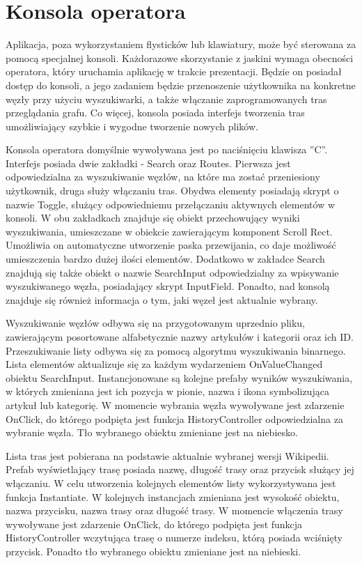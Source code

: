 \section{Konsola operatora}
Aplikacja, poza wykorzystaniem flysticków lub klawiatury, może być sterowana za pomocą specjalnej konsoli. Każdorazowe skorzystanie z jaskini wymaga obecności operatora, który uruchamia aplikację w trakcie prezentacji. Będzie on posiadał dostęp do konsoli, a jego zadaniem będzie przenoszenie użytkownika na konkretne węzły przy użyciu wyszukiwarki, a także włączanie zaprogramowanych tras przeglądania grafu. Co więcej, konsola posiada interfejs tworzenia tras umożliwiający szybkie i wygodne tworzenie nowych plików. 

Konsola operatora domyślnie wywoływana jest po naciśnięciu klawisza ''C''. Interfejs posiada dwie zakładki - Search oraz Routes. Pierwsza jest odpowiedzialna za wyszukiwanie węzłów, na które ma zostać przeniesiony użytkownik, druga służy włączaniu tras. Obydwa elementy posiadają skrypt o nazwie Toggle, służący odpowiedniemu przełączaniu aktywnych elementów w konsoli. W obu zakładkach znajduje się obiekt przechowujący wyniki wyszukiwania, umieszczane w obiekcie zawierającym komponent Scroll Rect. Umożliwia on automatyczne utworzenie paska przewijania, co daje możliwość umieszczenia bardzo dużej ilości elementów.  Dodatkowo w zakładce Search znajdują się także obiekt o nazwie SearchInput odpowiedzialny za wpisywanie wyszukiwanego węzła, posiadający skrypt InputField. Ponadto, nad konsolą znajduje się również informacja o tym, jaki węzeł jest aktualnie wybrany.


Wyszukiwanie węzłów odbywa się na przygotowanym uprzednio pliku, zawierającym posortowane alfabetycznie nazwy artykułów i kategorii oraz ich ID. Przeszukiwanie listy odbywa się za pomocą algorytmu wyszukiwania binarnego. Lista elementów aktualizuje się za każdym wydarzeniem OnValueChanged obiektu SearchInput. Instancjonowane są kolejne prefaby wyników wyszukiwania, w których zmieniana jest ich pozycja w pionie, nazwa i ikona symbolizująca artykuł lub kategorię. W momencie wybrania węzła wywoływane jest zdarzenie OnClick, do którego podpięta jest funkcja HistoryController odpowiedzialna za wybranie węzła. Tło wybranego obiektu zmieniane jest na niebiesko.

Lista tras jest pobierana na podstawie aktualnie wybranej wersji Wikipedii. Prefab wyświetlający trasę posiada nazwę, długość trasy oraz przycisk służący jej włączaniu. W celu utworzenia kolejnych elementów listy wykorzystywana jest funkcja Instantiate. W kolejnych instancjach zmieniana jest wysokość obiektu, nazwa przycisku, nazwa trasy oraz długość trasy.  W momencie włączenia trasy wywoływane jest zdarzenie OnClick, do którego podpięta jest funkcja HistoryController wczytująca trasę o numerze indeksu, którą posiada wciśnięty przycisk. Ponadto tło wybranego obiektu zmieniane jest na niebieski.
